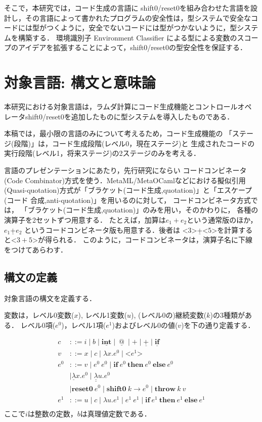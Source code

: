\documentclass[T]{compsoft}
\makeatletter
\newcommand\fun[2]{\lambda{#1}.{#2}}
\newcommand\Resetz{\textbf{reset0}}
\newcommand\Shiftz{\textbf{shift0}}
\newcommand\Throw{\textbf{throw}}
\newcommand\resetz[1]{\Resetz~{#1}}
\newcommand\shiftz[2]{\Shiftz~{#1}\to{#2}}
\newcommand\throw[2]{\Throw~{#1}~{#2}}
\newcommand\cfun[2]{\underline{\lambda}{#1}.{#2}}
\newcommand\ccfun[2]{\underline{\underline{\lambda}}{#1}.{#2}}
\newcommand\cPlus{\underline{\textbf{+}}}
\newcommand\cint{\underline{\textbf{int}}}
\newcommand\code[1]{\texttt{<}{#1}\texttt{>}}
\newcommand\ift[3]{\textbf{if}~{#1}~\textbf{then}~{#2}~\textbf{else}~{#3}}
\newcommand\cIf{\underline{\textbf{if}}}
\newcommand\cat{~\underline{@}~}
\theoremstyle{break}
\makeatother
\begin{document}
そこで，本研究では，コード生成の言語に shift0/reset0を組み合わせた言語を設計し，その言語によって書かれたプログラムの安全性は，型システムで安全なコードには型がつくように，安全でないコードには型がつかないように，型システムを構築する．
環境識別子 Environment Classifier による型による変数のスコープのアイデア\cite{Sudo2014,Taha:2003:EC:604131.604134}を拡張することによって，shift0/reset0の型安全性を保証する．

\section{対象言語: 構文と意味論}

本研究における対象言語は，ラムダ計算にコード生成機能とコントロールオペ
レータshift0/reset0を追加したものに型システムを導入したものである．

本稿では，最小限の言語のみについて考えるため，コード生成機能の
「ステージ(段階)」は，コード生成段階(レベル0，現在ステージ)と
生成されたコードの実行段階(レベル1，将来ステージ)の2ステージのみを考える．

言語のプレゼンテーションにあたり，先行研究にならい
コードコンビネータ(Code Combinator)方式を使う．MetaML/MetaOCamlなどにおける擬似引用
(Quasi-quotation)方式が「ブラケット(コード生成,quotation)」と「エスケープ(コード
合成,anti-quotation)」を用いるのに対して，
コードコンビネータ方式では，
「ブラケット(コード生成,quotation)」のみを用い，そのかわりに，
各種の演算子を2セットずつ用意する．
たとえば，加算は$e_1+e_2$という通常版のほか，
$e_1 \cPlus e_2$ というコードコンビネータ版も用意する．後者は
$\code{3} \cPlus \code{5}$を計算すると$\code{3+5}$が得られる．
このように，コードコンビネータは，演算子名に下線をつけてあらわす．

\subsection{構文の定義}

対象言語の構文を定義する．

変数は，レベル0変数($x$), レベル1変数($u$),
(レベル0の)継続変数($k$)の3種類がある．
レベル0項($e^0$)，レベル1項($e^1$)およびレベル0の値($v$)を下の通り定義する．

\begin{align*}
  c & ::= i \mid b \mid \cint
         \mid \cat \mid + \mid \cPlus \mid \cIf \\
  v & ::= x \mid c \mid \fun{x}{e^0} \mid \code{e^1} \\
  e^0 & ::=  v  \mid e^0~ e^0 \mid \ift{e^0}{e^0}{e^0} \\
    & \mid \cfun{x}{e^0}
      \mid \ccfun{u}{e^0} \\
    & \mid \resetz{e^0}
      \mid \shiftz{k}{e^0}
      \mid \throw{k}{v} \\
  e^1 & ::=  u \mid c \mid \fun{u}{e^1} \mid e^1~ e^1
      \mid \ift{e^1}{e^1}{e^1} \\
\end{align*}
ここで$i$は整数の定数，$b$は真理値定数である．
\end{document}
